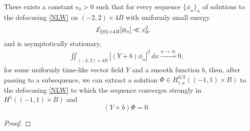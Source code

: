 

\begin{proposition}
	There exists a constant $\epsilon_0 > 0$ such that for every sequence $\{\phi_n\}_n$ of solutions to the defocusing \eqref{NLW} on $(-2, 2) \times 4B$ with uniformly small energy
		\begin{align}
			\mathcal E_{\{0\} \times 4B} [\phi_n] 
				&\ll \varepsilon_0^2, 
		\end{align}
	and is asymptotically stationary, 
		\begin{align}
			\iint_{(-2, 2) \times 4B} |(Y + b) \phi_n|^2 \, dx \overset{n \to \infty}{\longrightarrow} 0,
		\end{align}
	for some uniformly time-like vector field $Y$ and a smooth function $b$, then, after passing to a subsequence, we can extract a solution $\Phi \in H^{3/2}_{t, x} ((-1, 1) \times B)$ to the defocusing \eqref{NLW} to which the sequence converges strongly in $H^1 ((-1, 1) \times B)$ and 
		\begin{equation}
			(Y + b) \Phi = 0. 
		\end{equation}
		
\end{proposition} 
	
\begin{proof}
	
\end{proof}	
